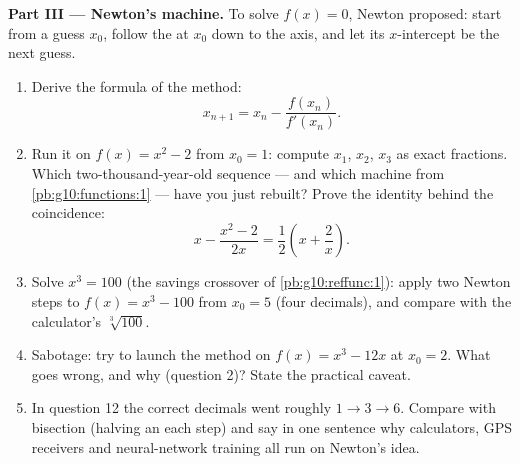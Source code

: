 \begin{problem}
\medskip
\noindent\textbf{Part III --- Newton's machine.}
To solve $f(x) = 0$, Newton proposed: start from a guess
$x_0$, follow the  at $x_0$ down to the axis, and let
its $x$-intercept be the next guess.
\begin{enumerate}[resume]
  \item Derive the formula of the method:
        \[
        x_{n + 1} = x_n - \frac{f(x_n)}{f'(x_n)} .
        \]
  \item Run it on $f(x) = x^2 - 2$ from $x_0 = 1$: compute
        $x_1$, $x_2$, $x_3$ as exact fractions. Which
        two-thousand-year-old sequence --- and which machine
        from \cref{pb:g10:functions:1} --- have you just
        rebuilt? Prove the identity behind the coincidence:
        \[
        x - \frac{x^2 - 2}{2x} = \frac12\left(x +
        \frac2x\right).
        \]
  \item Solve $x^3 = 100$ (the savings crossover of
        \cref{pb:g10:reffunc:1}): apply two Newton steps to
        $f(x) = x^3 - 100$ from $x_0 = 5$ (four decimals), and
        compare with the calculator's $\sqrt[3]{100}$.
  \item Sabotage: try to launch the method on
        $f(x) = x^3 - 12x$ at $x_0 = 2$. What goes wrong, and
        why (question 2)? State the practical caveat.
  \item In question 12 the correct decimals went roughly
        $1 \to 3 \to 6$. Compare with bisection (halving an
         each step) and say in one sentence why
        calculators, GPS receivers and neural-network training
        all run on Newton's idea.
\end{enumerate}


\end{problem}
